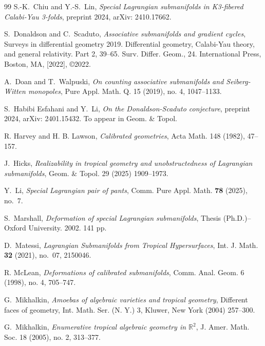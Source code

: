 \documentclass{article}
\theoremstyle{definition}
\begin{document}
    \begin{thebibliography}{99}
         S.-K.~Chiu and Y.-S.~Lin, \emph{Special Lagrangian submanifolds in K3-fibered Calabi-Yau 3-folds}, preprint 2024, arXiv: 2410.17662. 
    
         S.~Donaldson and C.~Scaduto, \emph{
           Associative submanifolds and gradient cycles}, Surveys in differential geometry 2019. Differential geometry, Calabi-Yau theory, and general relativity. Part 2, 39–65. Surv. Differ. Geom., 24. International Press, Boston, MA, [2022], ©2022.

         A.~Doan and T.~Walpuski, \emph{
            On counting associative submanifolds and Seiberg-Witten monopoles}, Pure Appl. Math. Q. 15 (2019), no. 4, 1047–1133.

         S.~Habibi Esfahani and Y.~Li, \emph{ On the Donaldson-Scaduto conjecture}, preprint 2024, arXiv: 2401.15432. To appear in Geom. \& Topol.

         R. Harvey and H. B. Lawson, \emph{Calibrated geometries}, Acta Math. 148 (1982), 47–157.


         J.~Hicks, \emph{Realizability in tropical geometry and unobstructedness of Lagrangian submanifolds}, Geom. \& Topol. 29 (2025) 1909–1973.
    
         Y.~Li, \emph{Special Lagrangian pair of pants}, Comm. Pure Appl. Math. \textbf{78} (2025), no.~7.

         S.~Marshall, \emph{Deformation of special Lagrangian submanifolds}, Thesis (Ph.D.)–Oxford University. 2002. 141 pp.

         D.~Matessi, \emph{Lagrangian Submanifolds from Tropical Hypersurfaces}, Int. J. Math. \textbf{32} (2021), no.~07, 2150046.

         R. McLean, \emph{Deformations of calibrated submanifolds}, Comm. Anal. Geom. 6 (1998), no. 4, 705–747.


          G.~Mikhalkin, \emph{Amoebas of algebraic varieties and tropical geometry}, Different faces of geometry, Int. Math. Ser. (N. Y.) 3, Kluwer, New York (2004) 257–300.

         G.~Mikhalkin, \emph{
           Enumerative tropical algebraic geometry in $\mathbb{R}^2$},
          J. Amer. Math. Soc. 18 (2005), no. 2, 313–377.


\end{thebibliography}
\end{document}

